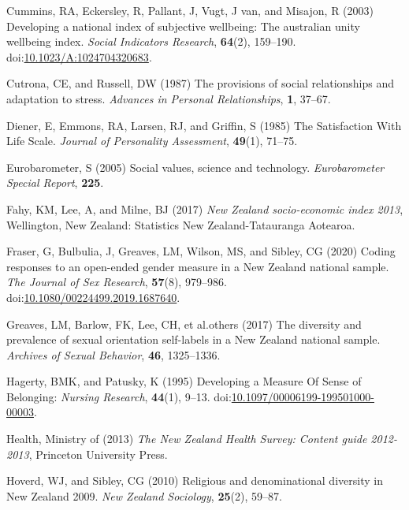 \documentclass[
  single column]{article}
\newlength{\cslhangindent}
\newenvironment{CSLReferences}[2] %
 {\begin{list}{}{%
  \setlength{\itemindent}{0pt}
  \setlength{\leftmargin}{0pt}
  \setlength{\parsep}{0pt}
  \ifodd #1
   \setlength{\leftmargin}{\cslhangindent}
   \setlength{\itemindent}{-1\cslhangindent}
  \fi
  \setlength{\itemsep}{#2\baselineskip}}}
 {\end{list}}
\begin{document}
\begin{CSLReferences}{1}{0}
Cummins, RA, Eckersley, R, Pallant, J, Vugt, J van, and Misajon, R
(2003) Developing a national index of subjective wellbeing: The
australian unity wellbeing index. \emph{Social Indicators Research},
\textbf{64}(2), 159--190.
doi:\href{https://doi.org/10.1023/A:1024704320683}{10.1023/A:1024704320683}.

Cutrona, CE, and Russell, DW (1987) The provisions of social
relationships and adaptation to stress. \emph{Advances in Personal
Relationships}, \textbf{1}, 37--67.

Diener, E, Emmons, RA, Larsen, RJ, and Griffin, S (1985) The
Satisfaction With Life Scale. \emph{Journal of Personality Assessment},
\textbf{49}(1), 71--75.

Eurobarometer, S (2005) Social values, science and technology.
\emph{Eurobarometer Special Report}, \textbf{225}.

Fahy, KM, Lee, A, and Milne, BJ (2017) \emph{{N}ew {Z}ealand
socio-economic index 2013}, Wellington, New Zealand: Statistics New
Zealand-Tatauranga Aotearoa.

Fraser, G, Bulbulia, J, Greaves, LM, Wilson, MS, and Sibley, CG (2020)
Coding responses to an open-ended gender measure in a {N}ew {Z}ealand
national sample. \emph{The Journal of Sex Research}, \textbf{57}(8),
979--986.
doi:\href{https://doi.org/10.1080/00224499.2019.1687640}{10.1080/00224499.2019.1687640}.

Greaves, LM, Barlow, FK, Lee, CH, et al.others (2017) The diversity and
prevalence of sexual orientation self-labels in a {N}ew {Z}ealand
national sample. \emph{Archives of Sexual Behavior}, \textbf{46},
1325--1336.

Hagerty, BMK, and Patusky, K (1995) Developing a Measure Of Sense of
Belonging: \emph{Nursing Research}, \textbf{44}(1), 9--13.
doi:\href{https://doi.org/10.1097/00006199-199501000-00003}{10.1097/00006199-199501000-00003}.

Health, Ministry of (2013) \emph{The {N}ew {Z}ealand {H}ealth {S}urvey:
Content guide 2012-2013}, Princeton University Press.

Hoverd, WJ, and Sibley, CG (2010) Religious and denominational diversity
in {N}ew {Z}ealand 2009. \emph{New Zealand Sociology}, \textbf{25}(2),
59--87.


\end{CSLReferences}
\end{document}
